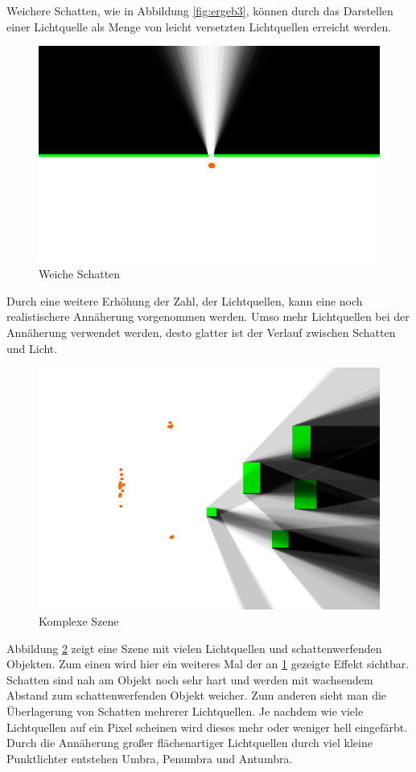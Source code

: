 Weichere Schatten, wie in Abbildung \ref{fig:ergeb3}, können durch das Darstellen einer Lichtquelle
als Menge von leicht versetzten Lichtquellen erreicht werden.

\begin{figure}[t]
	\centering
	\includegraphics[width=\columnwidth]{images/ergebnis.png}
	\caption{Weiche Schatten}
	\label{fig:ergeb2}
\end{figure}

Durch eine weitere Erhöhung der Zahl, der Lichtquellen, kann eine noch realistischere Annäherung
vorgenommen werden. Umso mehr Lichtquellen bei der Annäherung verwendet werden, desto glatter ist
der Verlauf zwischen Schatten und Licht.

\begin{figure}[t]
	\centering
	\includegraphics[width=\columnwidth]{images/ergebnis_4.png}
	\caption{Komplexe Szene}
	\label{fig:ergeb1}
\end{figure}

Abbildung \ref{fig:ergeb1} zeigt eine Szene mit vielen Lichtquellen und schattenwerfenden Objekten.
Zum einen wird hier ein weiteres Mal der an \ref{fig:ergeb2} gezeigte Effekt sichtbar. Schatten
sind nah am Objekt noch sehr hart und werden mit wachsendem Abstand zum schattenwerfenden Objekt
weicher. Zum anderen sieht man die Überlagerung von Schatten mehrerer Lichtquellen. Je nachdem wie
viele Lichtquellen auf ein Pixel scheinen wird dieses mehr oder weniger hell eingefärbt. Durch die
Annäherung großer flächenartiger Lichtquellen durch viel kleine Punktlichter entstehen Umbra,
Penumbra und Antumbra.
